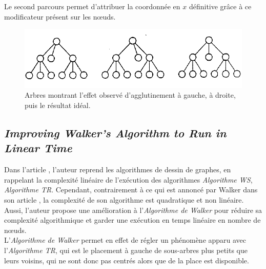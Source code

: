 \documentclass{article}
\begin{document}
  Le second parcours permet d'attribuer la coordonnée en $x$ définitive grâce à ce modificateur présent sur les n\oe{}uds.\\
  
   \vfill
  \begin{figure}[h]
    \begin{center}
        \includegraphics[scale=0.4]{arbreWalker.png}
    \end{center}
    \caption{Arbres montrant l'effet observé d'agglutinement à gauche, à droite, puis le résultat idéal.
	\cite{article90}}
  \label{fig:arbresWalker}
\end{figure}
\vfill
  
  \newpage
  \subsection{\emph{Improving Walker’s Algorithm to Run in Linear Time}}
  
  Dans l'article \cite{article02}, l'auteur reprend les algorithmes de dessin de graphes, en rappelant la complexité linéaire de l'exécution des algorithmes \emph{Algorithme WS}, \emph{Algorithme TR}. Cependant, contrairement à ce qui est annoncé par Walker dans son article \cite{article90}, la complexité de son algorithme est quadratique et non linéaire. Aussi, l'auteur propose une amélioration à l'\emph{Algorithme de Walker} pour réduire sa complexité algorithmique et garder une exécution en temps linéaire en nombre de n\oe{}uds.\\
  
  L'\emph{Algorithme de Walker} permet en effet de régler un phénomène apparu avec l'\emph{Algorithme TR}, qui est le placement à gauche de sous-arbres plus petits que leurs voisins, qui ne sont donc pas centrés alors que de la place est disponible.\\
  
\end{document}
